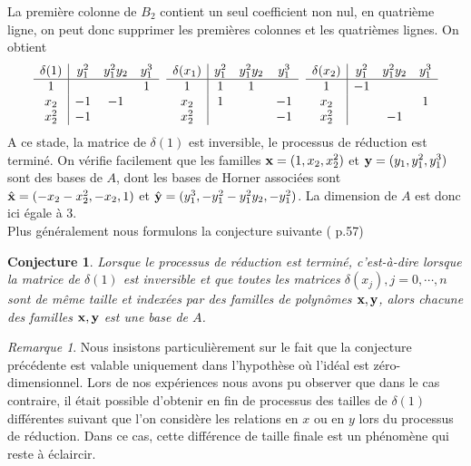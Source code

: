 \documentclass{article}
\theoremstyle{plain}%
\newtheorem{conj}{Conjecture}
\theoremstyle{definition}
\theoremstyle{remark}
\newtheorem*{rem}{Remarque}
\begin{document}
La première colonne de $B_2$ contient un seul coefficient non nul, en quatrième ligne, on peut donc supprimer les premières colonnes et les quatrièmes lignes. On obtient\\

$$
\begin{array}{c|ccc}
	\delta(1) & y_1^2 & y_1^2y_2 & y_1^3 \\
	\hline
	1  &  &  & 1 \\
	x_2  & -1 & -1 & \\
	x_2^2 & -1 &  &
\end{array}
\hspace{0.2cm}
\begin{array}{c|ccc}
	\delta(x_1) & y_1^2 & y_1^2y_2 & y_1^3 \\
	\hline
	1  & 1 & 1 & \\
	x_2  & 1 &  & -1\\
	x_2^2  &  &  & -1
\end{array}
\hspace{0.2cm}
\begin{array}{c|ccc}
	\delta(x_2) & y_1^2 & y_1^2y_2 & y_1^3 \\
	\hline
	1  & -1 &  & \\
	x_2  &  &  & 1 \\
	x_2^2  &  & -1 &
\end{array}
$$
A ce stade, la matrice de $\delta(1)$ est inversible, le processus de réduction est terminé. On vérifie facilement que les familles $\bold{x} = (1, x_2, x_2^{2})$ et $\bold{y} = (y_1, y_1^{2}, y_1^{3})$ sont des bases de $A$, dont les bases de Horner associées sont $\hat{\bold{x}} = (-x_2-x_2^{2}, -x_{2}, 1)$ et $\hat{\bold{y}} = (y_1^{3}, -y_1^{2}-y_1^{2}y_2, -y_1^{2})$. La dimension de $A$ est donc ici égale à $3$.\\

Plus généralement nous formulons la conjecture suivante (\cite{jpc} p.57)
\begin{conj}
Lorsque le processus de réduction est terminé, c'est-à-dire lorsque la matrice de $\delta(1)$ est inversible et que toutes les matrices $\delta(x_j), j=0, \cdots, n$ sont de même taille et indexées par des familles de polynômes $\bold{x, y}$, alors chacune des familles $\bold{x, y}$ est une base de $A$.
\end{conj}

\begin{rem}
Nous insistons particulièrement sur le fait que la conjecture précédente est valable uniquement dans l'hypothèse où l'idéal est zéro-dimensionnel. Lors de nos expériences nous avons pu observer que dans le cas contraire, il était possible d'obtenir en fin de processus des tailles de $\delta(1)$ différentes suivant que l'on considère les relations en $x$ ou en $y$ lors du processus de réduction. Dans ce cas, cette différence de taille finale est un phénomène qui reste à éclaircir.
\end{rem}
\end{document}
